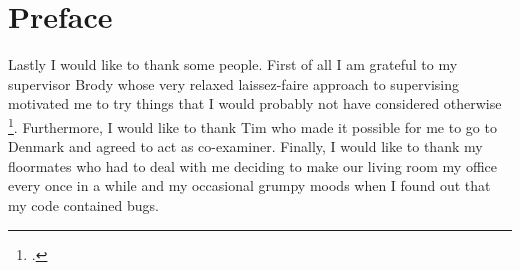 \chapter{Preface}
\label{ch:Preface}
Lastly I would like to thank some people. First of all I am grateful to my supervisor Brody whose very relaxed laissez-faire approach to supervising motivated me to try things that I would probably not have considered otherwise \footcite{Apparently semi-supervised learning sounds fancy but doesn't really work that well for SDM.}. Furthermore, I would like to thank Tim who made it possible for me to go to Denmark and agreed to act as co-examiner. Finally, I would like to thank my floormates who had to deal with me deciding to make our living room my office every once in a while and my occasional grumpy moods when I found out that my code contained bugs.